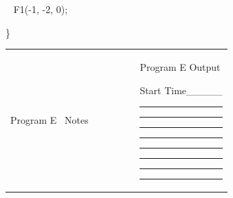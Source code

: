 \documentclass[]{article}
\begin{document}
{~ F1(-1, -2, 0);}

{\}}

{}

{}

\href{}{}\href{}{}

\begin{longtable}[]{@{}ll@{}}
\toprule
\begin{minipage}[t]{0.47\columnwidth}\raggedright\strut
{Program E ~Notes ~~~~~~~~}
\strut\end{minipage} &
\begin{minipage}[t]{0.47\columnwidth}\raggedright\strut
{Program E Output}

{}

{}

{Start Time\_\_\_\_\_}

{}

\begin{center}\rule{0.5\linewidth}{\linethickness}\end{center}

{}

\begin{center}\rule{0.5\linewidth}{\linethickness}\end{center}

{}

\begin{center}\rule{0.5\linewidth}{\linethickness}\end{center}

{}

\begin{center}\rule{0.5\linewidth}{\linethickness}\end{center}

{}

\begin{center}\rule{0.5\linewidth}{\linethickness}\end{center}

{}

\begin{center}\rule{0.5\linewidth}{\linethickness}\end{center}

{}

\begin{center}\rule{0.5\linewidth}{\linethickness}\end{center}

{}

\begin{center}\rule{0.5\linewidth}{\linethickness}\end{center}


\end{minipage}
\end{longtable}
\end{document}
